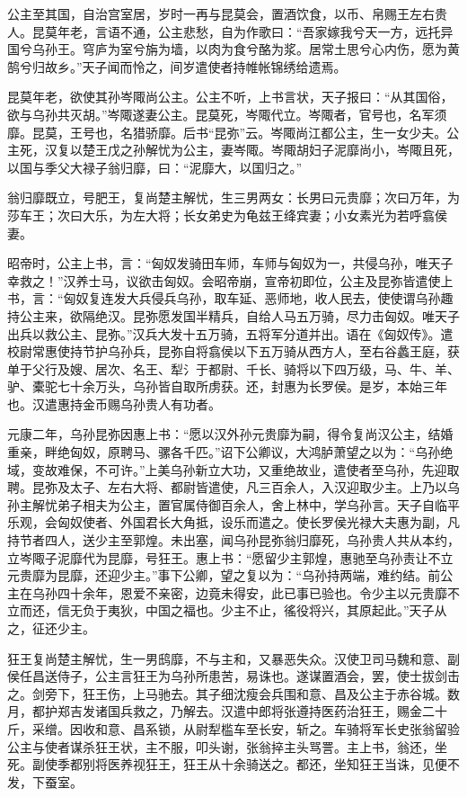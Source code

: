 \documentclass[]{article}
\begin{document}
公主至其国，自治宫室居，岁时一再与昆莫会，置酒饮食，以币、帛赐王左右贵人。昆莫年老，言语不通，公主悲愁，自为作歌曰：``吾家嫁我兮天一方，远托异国兮乌孙王。穹庐为室兮旃为墙，以肉为食兮酪为浆。居常土思兮心内伤，愿为黄鹄兮归故乡。''天子闻而怜之，间岁遣使者持帷帐锦绣给遗焉。

昆莫年老，欲使其孙岑陬尚公主。公主不听，上书言状，天子报曰：``从其国俗，欲与乌孙共灭胡。''岑陬遂妻公主。昆莫死，岑陬代立。岑陬者，官号也，名军须靡。昆莫，王号也，名猎骄靡。后书``昆弥''云。岑陬尚江都公主，生一女少夫。公主死，汉复以楚王戊之孙解忧为公主，妻岑陬。岑陬胡妇子泥靡尚小，岑陬且死，以国与季父大禄子翁归靡，曰：``泥靡大，以国归之。''

翁归靡既立，号肥王，复尚楚主解忧，生三男两女：长男曰元贵靡；次曰万年，为莎车王；次曰大乐，为左大将；长女弟史为龟兹王绛宾妻；小女素光为若呼翕侯妻。

昭帝时，公主上书，言：``匈奴发骑田车师，车师与匈奴为一，共侵乌孙，唯天子幸救之！''汉养士马，议欲击匈奴。会昭帝崩，宣帝初即位，公主及昆弥皆遣使上书，言：``匈奴复连发大兵侵兵乌孙，取车延、恶师地，收人民去，使使谓乌孙趣持公主来，欲隔绝汉。昆弥愿发国半精兵，自给人马五万骑，尽力击匈奴。唯天子出兵以救公主、昆弥。''汉兵大发十五万骑，五将军分道并出。语在《匈奴传》。遣校尉常惠使持节护乌孙兵，昆弥自将翕侯以下五万骑从西方人，至右谷蠡王庭，获单于父行及嫂、居次、名王、犁氵于都尉、千长、骑将以下四万级，马、牛、羊、驴、橐驼七十余万头，乌孙皆自取所虏获。还，封惠为长罗侯。是岁，本始三年也。汉遣惠持金币赐乌孙贵人有功者。

元康二年，乌孙昆弥因惠上书：``愿以汉外孙元贵靡为嗣，得令复尚汉公主，结婚重亲，畔绝匈奴，原聘马、骡各千匹。''诏下公卿议，大鸿胪萧望之以为：``乌孙绝域，变故难保，不可许。''上美乌孙新立大功，又重绝故业，遣使者至乌孙，先迎取聘。昆弥及太子、左右大将、都尉皆遣使，凡三百余人，入汉迎取少主。上乃以乌孙主解忧弟子相夫为公主，置官属侍御百余人，舍上林中，学乌孙言。天子自临平乐观，会匈奴使者、外国君长大角抵，设乐而遣之。使长罗侯光禄大夫惠为副，凡持节者四人，送少主至郭煌。未出塞，闻乌孙昆弥翁归靡死，乌孙贵人共从本约，立岑陬子泥靡代为昆靡，号狂王。惠上书：``愿留少主郭煌，惠驰至乌孙责让不立元贵靡为昆靡，还迎少主。''事下公卿，望之复以为：``乌孙持两端，难约结。前公主在乌孙四十余年，恩爱不亲密，边竟未得安，此已事已验也。令少主以元贵靡不立而还，信无负于夷狄，中国之福也。少主不止，徭役将兴，其原起此。''天子从之，征还少主。

狂王复尚楚主解忧，生一男鸱靡，不与主和，又暴恶失众。汉使卫司马魏和意、副侯任昌送侍子，公主言狂王为乌孙所患苦，易诛也。遂谋置酒会，罢，使士拔剑击之。剑旁下，狂王伤，上马驰去。其子细沈瘦会兵围和意、昌及公主于赤谷城。数月，都护郑吉发诸国兵救之，乃解去。汉遣中郎将张遵持医药治狂王，赐金二十斤，采缯。因收和意、昌系锁，从尉犁槛车至长安，斩之。车骑将军长史张翁留验公主与使者谋杀狂王状，主不服，叩头谢，张翁捽主头骂詈。主上书，翁还，坐死。副使季都别将医养视狂王，狂王从十余骑送之。都还，坐知狂王当诛，见便不发，下蚕室。
\end{document}
